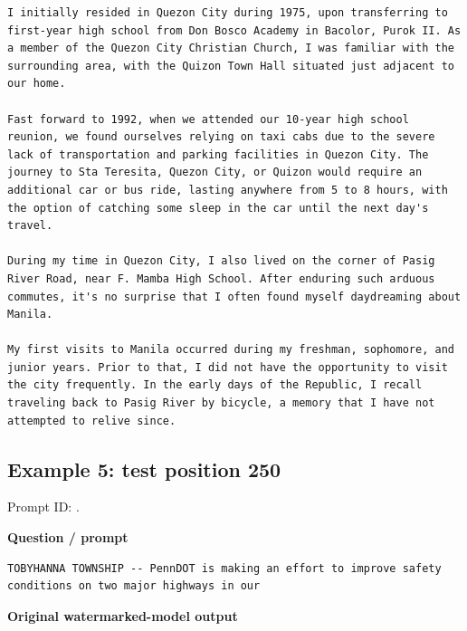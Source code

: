 \begin{Verbatim}
I initially resided in Quezon City during 1975, upon transferring to first-year high school from Don Bosco Academy in Bacolor, Purok II. As a member of the Quezon City Christian Church, I was familiar with the surrounding area, with the Quizon Town Hall situated just adjacent to our home. 

Fast forward to 1992, when we attended our 10-year high school reunion, we found ourselves relying on taxi cabs due to the severe lack of transportation and parking facilities in Quezon City. The journey to Sta Teresita, Quezon City, or Quizon would require an additional car or bus ride, lasting anywhere from 5 to 8 hours, with the option of catching some sleep in the car until the next day's travel. 

During my time in Quezon City, I also lived on the corner of Pasig River Road, near F. Mamba High School. After enduring such arduous commutes, it's no surprise that I often found myself daydreaming about Manila.

My first visits to Manila occurred during my freshman, sophomore, and junior years. Prior to that, I did not have the opportunity to visit the city frequently. In the early days of the Republic, I recall traveling back to Pasig River by bicycle, a memory that I have not attempted to relive since.
\end{Verbatim}

\subsection{Example 5: test position
250}\label{record-docs-watermarking-qualitative-paper-kgw-vanilla-md-example-5-test-position-250}

Prompt ID:
\texttt{}.

\textbf{Question / prompt}

\begin{Verbatim}
TOBYHANNA TOWNSHIP -- PennDOT is making an effort to improve safety conditions on two major highways in our
\end{Verbatim}

\textbf{Original watermarked-model output}

